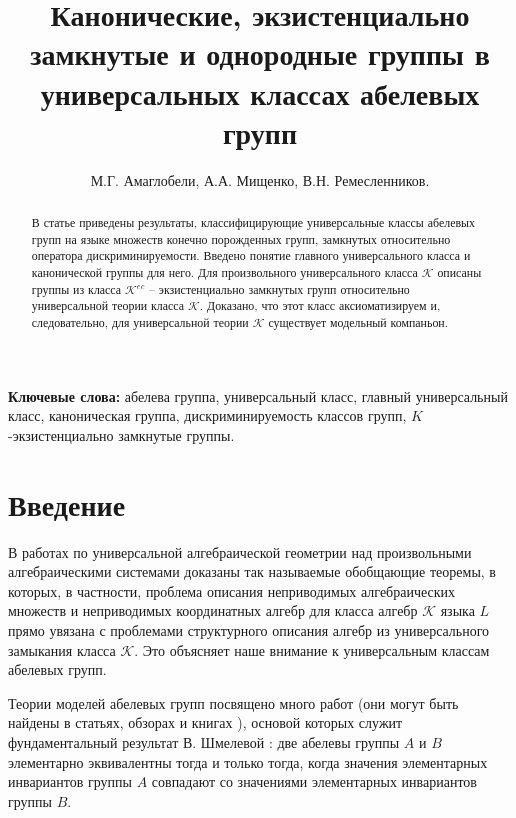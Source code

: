 \documentclass[12pt]{extarticle} %
\title{Канонические, экзистенциально замкнутые и однородные группы в универсальных классах абелевых групп}
\author{М.Г. Амаглобели, А.А. Мищенко, В.Н. Ремесленников.}
\def\K{{\mathcal{K}}}
\def\Kec{\mathcal{K}^{ec}}
\begin{document}
\maketitle




\begin{abstract}
В статье приведены результаты, классифицирующие универсальные классы абелевых групп на языке множеств конечно порожденных групп, замкнутых относительно оператора дискриминируемости. Введено понятие главного универсального класса и канонической группы для него. Для произвольного универсального класса $\K$ описаны группы из класса $\Kec$ -- экзистенциально замкнутых групп относительно универсальной теории класса $\K$. Доказано, что этот класс аксиоматизируем и, следовательно, для универсальной теории $\K$ существует модельный компаньон.
\end{abstract}



\begin{center}
\begin{minipage}{\textwidth - 2.5cm}
\small
\textbf{Ключевые слова:} абелева группа, универсальный класс, главный универсальный класс, каноническая группа, дискриминируемость классов групп, $K$-экзистенциально замкнутые группы.
\end{minipage}
\end{center}

\tableofcontents

\listoftodos


\section{Введение}

В работах \cite{DMR1, DMR2} по универсальной алгебраической геометрии над произвольными алгебраическими системами доказаны так называемые обобщающие теоремы, в которых, в частности, проблема описания неприводимых алгебраических множеств и неприводимых координатных алгебр для класса алгебр $\K$ языка $L$ прямо увязана с проблемами структурного описания алгебр из универсального замыкания класса $\K$. Это объясняет наше внимание к универсальным классам абелевых групп.

Теории моделей абелевых групп посвящено много работ (они могут быть найдены в статьях, обзорах и книгах \cite{Prest1, Prest2, RR, Hisamiev1,  Palutin1, Palutin2, Ershov, Hodges, Mac, Z}), основой которых служит фундаментальный результат В. Шмелевой \cite{Szm}: две абелевы группы $A$ и $B$ элементарно эквивалентны тогда  и только тогда, когда значения элементарных инвариантов группы $A$ совпадают со значениями элементарных инвариантов группы $B$. 
\end{document}
